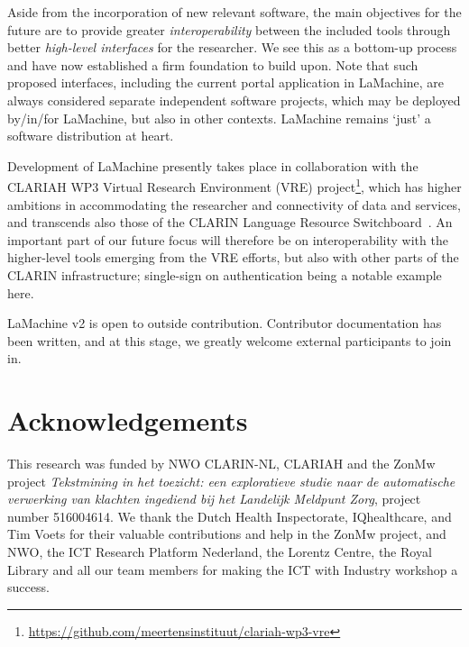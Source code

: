 \documentclass[a4paper,11pt]{article}
\begin{document}
Aside from the incorporation of new relevant software, the main objectives for the future are to provide
greater \emph{interoperability} between the included tools through better \emph{high-level interfaces} for the
researcher. We see this as a bottom-up process and have now established a firm foundation to build upon. Note that such
proposed interfaces, including the current portal application in LaMachine, are always considered separate independent
software projects, which may be deployed by/in/for LaMachine, but also in other contexts. LaMachine remains `just'
a software distribution at heart.

Development of LaMachine presently takes place in collaboration with the CLARIAH WP3 Virtual Research Environment (VRE)
project\footnote{\url{https://github.com/meertensinstituut/clariah-wp3-vre}}, which has higher ambitions in
accommodating the researcher and connectivity of data and services, and transcends also those of the CLARIN Language
Resource Switchboard~\cite{switchboard}. An important part of our future focus will therefore be on interoperability
with the higher-level tools emerging from the VRE efforts, but also with other parts of the CLARIN infrastructure;
single-sign on authentication being a notable example here.

LaMachine v2 is open to  outside contribution. Contributor documentation has been written, and at this stage, we greatly
welcome external participants to join in.

\section*{Acknowledgements}

This research was funded by NWO CLARIN-NL, CLARIAH and the ZonMw project {\it Tekstmining in het toezicht: een exploratieve studie naar de automatische verwerking van klachten ingediend bij het Landelijk Meldpunt Zorg}, project number 516004614. We thank the Dutch Health Inspectorate, IQhealthcare, and Tim Voets for their valuable contributions and help in the ZonMw project, and NWO, the ICT Research Platform Nederland, the Lorentz Centre, the Royal Library and all our team members for making the ICT with Industry workshop a success.



\end{document}

